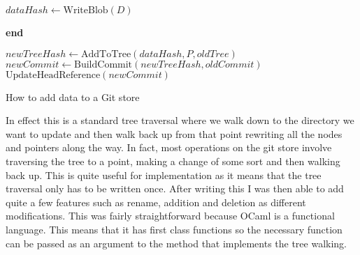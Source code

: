 \begin{algorithm}[h]
\SetAlgoLined
\DontPrintSemicolon



\BlankLine
{}
$ dataHash \leftarrow \textrm{WriteBlob}(D) $\;

\BlankLine
{}
\textbf{end}

\BlankLine
{}
$ newTreeHash \leftarrow \textrm{AddToTree}(dataHash, P, oldTree) $\;
$ newCommit \leftarrow \textrm{BuildCommit}(newTreeHash, oldCommit) $\;
$ \textrm{UpdateHeadReference}(newCommit) $\;
\caption{How to add data to a Git store}
\label{algorithm:addtostore}
\end{algorithm}
\medskip

In effect this is a standard tree traversal where we walk down to the directory we want to update and then walk back up from that point rewriting all the nodes and pointers along the way. In fact, most operations on the git store involve traversing the tree to a point, making a change of some sort and then walking back up. This is quite useful for implementation as it means that the tree traversal only has to be written once. After writing this I was then able to add quite a few features such as rename, addition and deletion as different modifications. This was fairly straightforward because OCaml is a functional language. This means that it has first class functions so the necessary function can be passed as an argument to the method that implements the tree walking.

